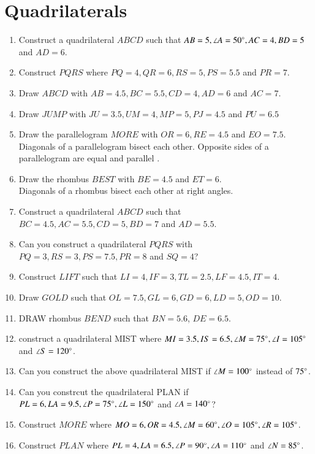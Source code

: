 \documentclass[journal,12pt,twocolumn]{IEEEtran}
\renewcommand\thesection{\arabic{section}}
\begin{document}
\section{Quadrilaterals}
\begin{enumerate}[label=\thesection.\arabic*
,ref=\thesection.\theenumi]
\item Construct a quadrilateral $ABCD$ such that $AB=5, \angle A = 50\degree, AC = 4, BD = 5$ and $AD = 6$.
\item Construct $PQRS$ where $PQ = 4, QR = 6, RS = 5, PS = 5.5$ and $PR = 7$.
\item Draw $ABCD$ with $AB=4.5, BC = 5.5, CD = 4, AD =6$ and $AC = 7$.
\item Draw $JUMP$ with $JU = 3.5, UM=4, MP = 5, PJ =4.5$ and $PU = 6.5$
\item Draw the parallelogram $MORE$ with $OR = 6, RE = 4.5$ and $EO=7.5$.
\\
\solution
Diagonals of a parallelogram bisect each other.  Opposite sides of a parallelogram are equal and parallel
.
\item Draw the rhombus $BEST$ with $BE = 4.5$ and $ET = 6$. 
\\
\solution Diagonals of a rhombus bisect each other at right angles.
\item Construct a quadrilateral $ABCD$ such that $BC=4.5,  AC = 5.5, CD = 5, BD = 7$ and $AD = 5.5$.
\item Can you construct a quadrilateral $PQRS$ with $PQ=3, RS=3, PS=7.5, PR=8$ and $SQ=4$?
\item Construct $LIFT$ such that $LI = 4, IF = 3, TL = 2.5, LF = 4.5, IT=4$.
\item Draw $GOLD$ such that $OL=7.5, GL=6, GD=6, LD = 5, OD = 10$.
\item DRAW rhombus $BEND$ such that $BN = 5.6$, $DE = 6.5$.
\item construct a quadrilateral MIST where $MI = 3.5, IS = 6.5, \angle M = 75 \degree, \angle I = 105 \degree$ and $\angle S = 120 \degree$.
\item Can you construct the above quadrilateral MIST if $\angle M = 100 \degree$ instead of $75 \degree$.
\item Can you constrcut the quadrilateral PLAN if $PL = 6, LA = 9.5, \angle P = 75 \degree, \angle L = 150 \degree$ and $\angle A = 140 \degree$?
\item Construct $MORE$ where $MO = 6, OR = 4.5, \angle M = 60 \degree, \angle O = 105 \degree, \angle R = 105 \degree$.
\item Construct $PLAN$ where $PL = 4, LA = 6.5, \angle P = 90 \degree, \angle A = 110\degree$ and $\angle N = 85\degree$.

\end{enumerate}
\end{document}
